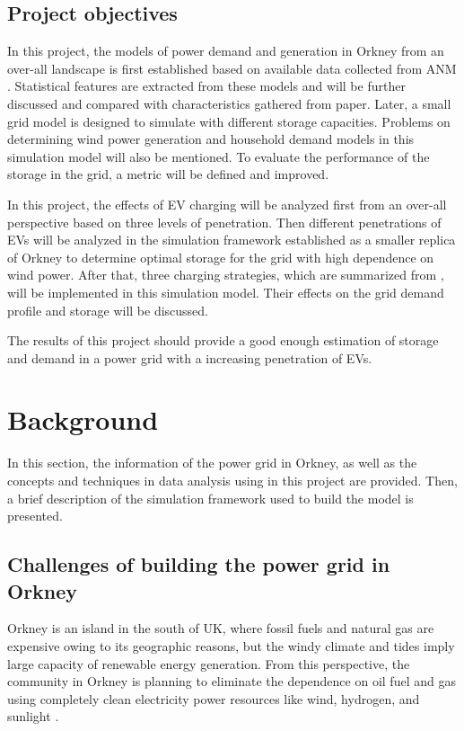 \documentclass[12pt,a4paper]{report}
\begin{document}
        \section{Project objectives}
        In this project, the models of power demand and generation in Orkney from an over-all landscape is first established based on available data collected from ANM \cite{website:ANM}. 
        Statistical features are extracted from these models and will be further discussed and compared with characteristics gathered from paper. 
        Later, a small grid model is designed to simulate with different storage capacities. 
        Problems on determining wind power generation and household demand models in this simulation model will also be mentioned. 
        To evaluate the performance of the storage in the grid, a metric will be defined and improved.

        In this project, the effects of EV charging will be analyzed first from an over-all perspective based on three levels of penetration.
        Then different penetrations of EVs will be analyzed in the simulation framework established as a smaller replica of Orkney to determine optimal storage for the grid with high dependence on wind power. 
        After that, three charging strategies, which are summarized from \cite{paper:Qian2011}, will be implemented in this simulation model. Their effects on the grid demand profile and storage will be discussed.

        The results of this project should provide a good enough estimation of storage and demand in a power grid with a increasing penetration of EVs.

    \chapter{Background}
        In this section, the information of the power grid in Orkney, as well as the concepts and techniques in data analysis using in this project are provided. Then, a brief description of the simulation framework used to build the model is presented.

        \section{Challenges of building the power grid in Orkney}
        Orkney is an island in the south of UK, where fossil fuels and natural gas are expensive owing to its geographic reasons, but the windy climate and tides imply large capacity of renewable energy generation.
        From this perspective, the community in Orkney is planning to eliminate the dependence on
        oil fuel and gas using completely clean electricity power resources like wind, hydrogen, and sunlight \cite{website:ReFLEXcouncil} \cite{website:orkney.com_2019}. 
        
\end{document}
